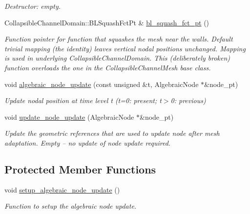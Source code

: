 \begin{DoxyCompactItemize}
\begin{DoxyCompactList}\small\item\em Destructor\+: empty. \end{DoxyCompactList}\item 
Collapsible\+Channel\+Domain\+::\+B\+L\+Squash\+Fct\+Pt \& \hyperlink{classoomph_1_1MyAlgebraicCollapsibleChannelMesh_ad488fafa275b664c739828d3e2a281bf}{bl\+\_\+squash\+\_\+fct\+\_\+pt} ()
\begin{DoxyCompactList}\small\item\em Function pointer for function that squashes the mesh near the walls. Default trivial mapping (the identity) leaves vertical nodal positions unchanged. Mapping is used in underlying Collapsible\+Channel\+Domain. This (deliberately broken) function overloads the one in the Collapsible\+Channel\+Mesh base class. \end{DoxyCompactList}\item 
void \hyperlink{classoomph_1_1MyAlgebraicCollapsibleChannelMesh_a28702ba4f4f10e9dfc495c916ddf6f82}{algebraic\+\_\+node\+\_\+update} (const unsigned \&t, Algebraic\+Node $\ast$\&node\+\_\+pt)
\begin{DoxyCompactList}\small\item\em Update nodal position at time level t (t=0\+: present; t$>$0\+: previous) \end{DoxyCompactList}\item 
void \hyperlink{classoomph_1_1MyAlgebraicCollapsibleChannelMesh_adb6c8c672e0810b59174babf3623f5bd}{update\+\_\+node\+\_\+update} (Algebraic\+Node $\ast$\&node\+\_\+pt)
\begin{DoxyCompactList}\small\item\em Update the geometric references that are used to update node after mesh adaptation. Empty -- no update of node update required. \end{DoxyCompactList}\end{DoxyCompactItemize}
\subsection*{Protected Member Functions}
\begin{DoxyCompactItemize}
\item 
void \hyperlink{classoomph_1_1MyAlgebraicCollapsibleChannelMesh_ad5ae1032e856e8997cc138b84a089452}{setup\+\_\+algebraic\+\_\+node\+\_\+update} ()
\begin{DoxyCompactList}\small\item\em Function to setup the algebraic node update. \end{DoxyCompactList}\end{DoxyCompactItemize}
